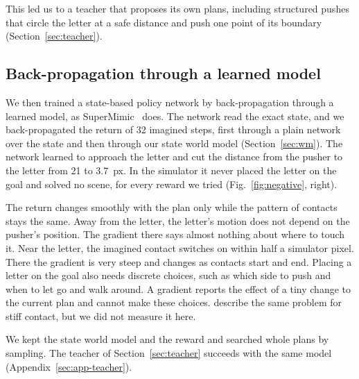 \documentclass[10pt,twocolumn,letterpaper]{article}
\begin{document}
This led us to a teacher that proposes its own plans, including structured pushes that circle the letter at a safe
distance and push one point of its boundary (Section~\ref{sec:teacher}).

\subsection{Back-propagation through a learned model}
\label{sec:bptt}

We then trained a state-based policy network by back-propagation through a learned model, as
SuperMimic~\citep{liao2026supermimic} does. The network read the exact state, and we back-propagated the return of 32
imagined steps, first through a plain network over the state and then through our state world model
(Section~\ref{sec:wm}). The network learned to approach the letter and cut the distance from the pusher to the letter
from 21 to 3.7~px. In the simulator it never placed the letter on the goal and solved no scene, for every reward we
tried (Fig.~\ref{fig:negative}, right). %

The return changes smoothly with the plan only while the pattern of contacts stays the same. Away from the letter, the
letter's motion does not depend on the pusher's position. The gradient there says almost nothing about where to touch
it. Near the letter, the imagined contact switches on within half a simulator pixel. There the gradient is very steep
and changes as contacts start and end. Placing a letter on the goal also needs discrete choices, such as which side to
push and when to let go and walk around. A gradient reports the effect of a tiny change to the current plan and cannot
make these choices. \citet{suh2022differentiable} describe the same problem for stiff contact, but we did not measure
it here. %

We kept the state world model and the reward and searched whole plans by sampling. The teacher of
Section~\ref{sec:teacher} succeeds with the same model (Appendix~\ref{sec:app-teacher}).
\end{document}
